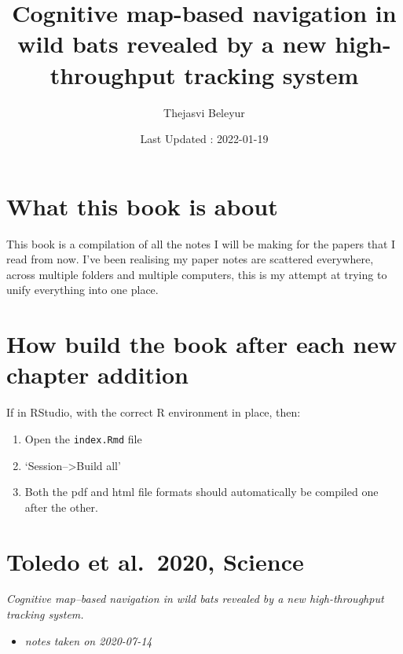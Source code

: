 \documentclass[
]{book}
\title{Cognitive map-based navigation in wild bats revealed by a new high- throughput tracking system}
\author{Thejasvi Beleyur}
\date{Last Updated : 2022-01-19}
\providecommand{\tightlist}{%
  \setlength{\itemsep}{0pt}\setlength{\parskip}{0pt}}
\begin{document}
\maketitle

{
\setcounter{tocdepth}{1}
\tableofcontents
}
\hypertarget{what-this-book-is-about}{%
\chapter*{What this book is about}\label{what-this-book-is-about}}

This book is a compilation of all the notes I will be making for the papers that I read from now.
I've been realising my paper notes are scattered everywhere, across multiple folders and multiple computers,
this is my attempt at trying to unify everything into one place.

\hypertarget{how-build-the-book-after-each-new-chapter-addition}{%
\chapter{How build the book after each new chapter addition}\label{how-build-the-book-after-each-new-chapter-addition}}

If in RStudio, with the correct R environment in place, then:

\begin{enumerate}
\def\labelenumi{\arabic{enumi}.}
\tightlist
\item
  Open the \texttt{index.Rmd} file
\item
  `Session--\textgreater Build all'
\item
  Both the pdf and html file formats should automatically be compiled one after the other.
\end{enumerate}

\hypertarget{toledo-et-al.-2020-science}{%
\chapter{Toledo et al.~2020, Science}\label{toledo-et-al.-2020-science}}


\emph{Cognitive map--based navigation in wild bats revealed by a new high-throughput tracking system.} \citep{toledo2020cognitive}

\begin{itemize}
\tightlist
\item
  \emph{notes taken on 2020-07-14}
\end{itemize}
\end{document}
